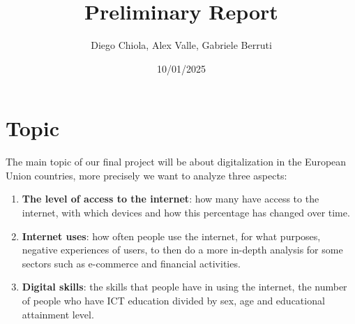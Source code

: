 \documentclass[12pt]{article}
\title{Preliminary Report}
\author{Diego Chiola, Alex Valle, Gabriele Berruti}
\date{10/01/2025}
\begin{document}
\maketitle
\newpage

\section{Topic}
The main topic of our final project will be about digitalization in the European
Union countries, more precisely we want to analyze three aspects:
\begin{enumerate}
    \item \textbf{The level of access to the internet}: how many have access to the
          internet, with which devices and how this percentage has changed over time.
    \item \textbf{Internet uses}: how often people use the internet, for what purposes,
          negative experiences of users, to then do a more in-depth analysis for some
          sectors such as e-commerce and financial activities.
    \item \textbf{Digital skills}: the skills that people have in using the internet,
          the number of people who have ICT education divided by sex, age and educational
          attainment level.
\end{enumerate}
\end{document}
